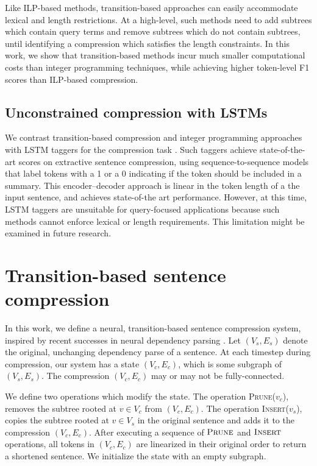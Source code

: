 \documentclass[11pt,a4paper]{article}
\begin{document}
Like ILP-based methods, transition-based approaches can easily accommodate lexical and length restrictions. At a high-level, such methods need to add subtrees which contain query terms and remove subtrees which do not contain subtrees, until identifying a compression which satisfies the length constraints. In this work, we show that transition-based methods incur much smaller computational costs than integer programming techniques, while achieving higher token-level F1 scores than ILP-based compression.

\subsection{Unconstrained compression with LSTMs}

We contrast transition-based compression and integer programming approaches with LSTM taggers for the compression task \cite{filippova2015sentence}. Such taggers achieve state-of-the-art scores on extractive sentence compression, using sequence-to-sequence models that label tokens with a 1 or a 0 indicating if the token should be included in a summary. This encoder--decoder approach is linear in the token length of a the input sentence, and achieves state-of-the art performance. However, at this time, LSTM taggers are unsuitable for query-focused applications because such methods cannot enforce lexical or length requirements. This limitation might be examined in future research.

\section{Transition-based sentence compression}\label{s:system}

In this work, we define a neural, transition-based sentence compression system, inspired by recent successes in neural dependency parsing \cite{D14-1082}. Let ${(V_s,E_s)}$ denote the original, unchanging dependency parse of a sentence. At each timestep during compression, our system has a state ${(V_c,E_c)}$, which is some subgraph of ${(V_s,E_s)}$. The compression ${(V_c,E_c)}$ may or may not be fully-connected. 

We define two operations which modify the state. The operation \textsc{Prune}($v_c$), removes the subtree rooted at $v \in V_c$ from ${(V_c,E_c)}$. The operation \textsc{Insert}($v_s$), copies the subtree rooted at $v \in V_s$ in the original sentence and adds it to the compression ${(V_c,E_c)}$. After executing a sequence of $\textsc{Prune}$ and $\textsc{Insert}$ operations, all tokens in ${(V_c,E_c)}$ are linearized in their original order to return a shortened sentence. We initialize the state with an empty subgraph. 
\end{document}
